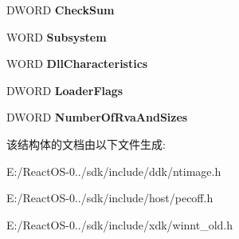 \begin{DoxyCompactItemize}
D\+W\+O\+RD {\bfseries Check\+Sum}
\item 
\mbox{\label{struct___i_m_a_g_e___o_p_t_i_o_n_a_l___h_e_a_d_e_r64_afedeb8911d64e97bafd352f4c97e2557}} 
W\+O\+RD {\bfseries Subsystem}
\item 
\mbox{\label{struct___i_m_a_g_e___o_p_t_i_o_n_a_l___h_e_a_d_e_r64_acb52816f699486ae920bb8537108e81d}} 
W\+O\+RD {\bfseries Dll\+Characteristics}
\item 
\mbox{\label{struct___i_m_a_g_e___o_p_t_i_o_n_a_l___h_e_a_d_e_r64_a731102c663ae88402d8aa08359c44ab5}} 
D\+W\+O\+RD {\bfseries Loader\+Flags}
\item 
\mbox{\label{struct___i_m_a_g_e___o_p_t_i_o_n_a_l___h_e_a_d_e_r64_a8f05696ef5a2588164d4e502519d30b4}} 
D\+W\+O\+RD {\bfseries Number\+Of\+Rva\+And\+Sizes}
\end{DoxyCompactItemize}


该结构体的文档由以下文件生成\+:\begin{DoxyCompactItemize}
\item 
E\+:/\+React\+O\+S-\/0../sdk/include/ddk/ntimage.\+h\item 
E\+:/\+React\+O\+S-\/0../sdk/include/host/pecoff.\+h\item 
E\+:/\+React\+O\+S-\/0../sdk/include/xdk/winnt\+\_\+old.\+h\end{DoxyCompactItemize}
